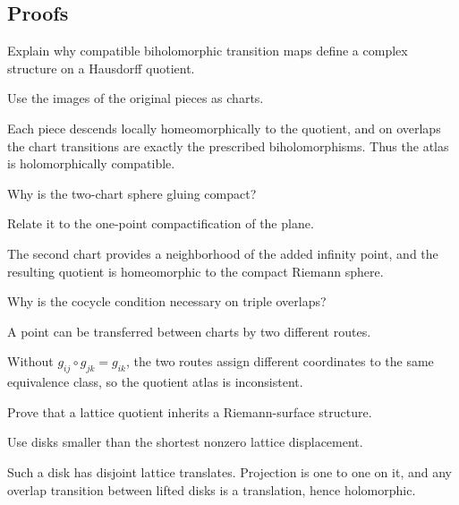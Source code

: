 \subsection*{Proofs}

\begin{exercise}\label{exr:iv25-expand-06}
Explain why compatible biholomorphic transition maps define a complex structure on a Hausdorff quotient.
\end{exercise}
\begin{hint}
Use the images of the original pieces as charts.
\end{hint}
\begin{solution}
Each piece descends locally homeomorphically to the quotient, and on overlaps the chart transitions are exactly the prescribed biholomorphisms. Thus the atlas is holomorphically compatible.
\end{solution}

\begin{exercise}\label{exr:iv25-expand-07}
Why is the two-chart sphere gluing compact?
\end{exercise}
\begin{hint}
Relate it to the one-point compactification of the plane.
\end{hint}
\begin{solution}
The second chart provides a neighborhood of the added infinity point, and the resulting quotient is homeomorphic to the compact Riemann sphere.
\end{solution}

\begin{exercise}\label{exr:iv25-expand-08}
Why is the cocycle condition necessary on triple overlaps?
\end{exercise}
\begin{hint}
A point can be transferred between charts by two different routes.
\end{hint}
\begin{solution}
Without \(g_{ij}\circ g_{jk}=g_{ik}\), the two routes assign different coordinates to the same equivalence class, so the quotient atlas is inconsistent.
\end{solution}

\begin{exercise}\label{exr:iv25-expand-09}
Prove that a lattice quotient inherits a Riemann-surface structure.
\end{exercise}
\begin{hint}
Use disks smaller than the shortest nonzero lattice displacement.
\end{hint}
\begin{solution}
Such a disk has disjoint lattice translates. Projection is one to one on it, and any overlap transition between lifted disks is a translation, hence holomorphic.
\end{solution}


